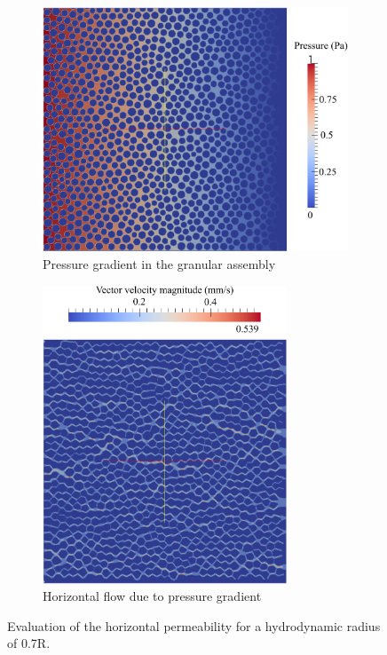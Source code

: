  
\begin{figure}[tbhp]
	\centering
	\begin{subfigure}[b]{0.475\textwidth}
		\centering
		\includegraphics[width=\textwidth]{Pressure}
		\caption{Pressure gradient in the granular assembly}
		\label{fig:pressure}
	\end{subfigure}
	\begin{subfigure}[b]{0.475\textwidth}
		\centering
		\includegraphics[width=0.8\textwidth]{Velocity}
		\caption{Horizontal flow due to pressure gradient}
		\label{fig:velocity}
	\end{subfigure}
	\caption{Evaluation of the horizontal permeability for a 
	hydrodynamic radius of 0.7R.}
	\label{fig:perm}
\end{figure}


